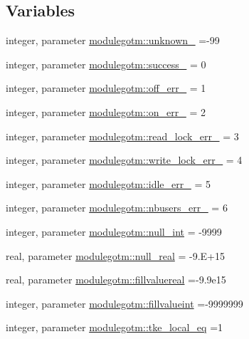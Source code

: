 \subsection*{Variables}
\begin{DoxyCompactItemize}
\item 
integer, parameter \mbox{\hyperlink{namespacemodulegotm_a0f598f7a7591ef502047d7bf9b41d8c4}{modulegotm\+::unknown\+\_\+}} =-\/99
\item 
integer, parameter \mbox{\hyperlink{namespacemodulegotm_adb6c42c1323d939b70b00c98f2106d11}{modulegotm\+::success\+\_\+}} = 0
\item 
integer, parameter \mbox{\hyperlink{namespacemodulegotm_af65e84e018f76a3a2d29f65589808c9d}{modulegotm\+::off\+\_\+err\+\_\+}} = 1
\item 
integer, parameter \mbox{\hyperlink{namespacemodulegotm_a97522a5857d2ea9ecdacaa45e530f142}{modulegotm\+::on\+\_\+err\+\_\+}} = 2
\item 
integer, parameter \mbox{\hyperlink{namespacemodulegotm_ac9524a6d32be82ce6528becff10d08ff}{modulegotm\+::read\+\_\+lock\+\_\+err\+\_\+}} = 3
\item 
integer, parameter \mbox{\hyperlink{namespacemodulegotm_ae9156b93cafbf0c50087599b64ff3d3d}{modulegotm\+::write\+\_\+lock\+\_\+err\+\_\+}} = 4
\item 
integer, parameter \mbox{\hyperlink{namespacemodulegotm_a39953f54bbdc8da782f3b50feef9d448}{modulegotm\+::idle\+\_\+err\+\_\+}} = 5
\item 
integer, parameter \mbox{\hyperlink{namespacemodulegotm_a98f0c25fc8853b787887f1ed35c706ad}{modulegotm\+::nbusers\+\_\+err\+\_\+}} = 6
\item 
integer, parameter \mbox{\hyperlink{namespacemodulegotm_a2e888b1f33eea5d6198b2b74c27aa11d}{modulegotm\+::null\+\_\+int}} = -\/9999
\item 
real, parameter \mbox{\hyperlink{namespacemodulegotm_a89fe021c998471f10e1252fbabba387c}{modulegotm\+::null\+\_\+real}} = -\/9.\+E+15
\item 
real, parameter \mbox{\hyperlink{namespacemodulegotm_a2faf16339e8c12fe4c7d39478460810f}{modulegotm\+::fillvaluereal}} =-\/9.\+9e15
\item 
integer, parameter \mbox{\hyperlink{namespacemodulegotm_a6843f6d6c95d7d5cbd9b92d5b399bd7c}{modulegotm\+::fillvalueint}} =-\/9999999
\item 
integer, parameter \mbox{\hyperlink{namespacemodulegotm_ac70f3cf4ffada602b184d8ccf56aea81}{modulegotm\+::tke\+\_\+local\+\_\+eq}} =1
\item 

\end{DoxyCompactItemize}
